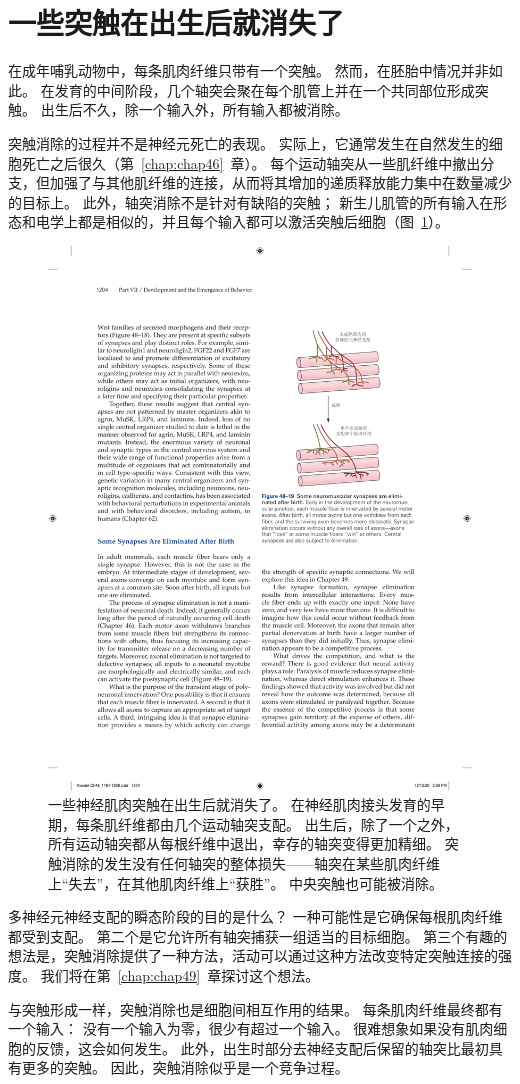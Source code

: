 \section{一些突触在出生后就消失了}

在成年哺乳动物中，每条肌肉纤维只带有一个突触。
然而，在胚胎中情况并非如此。
在发育的中间阶段，几个轴突会聚在每个肌管上并在一个共同部位形成突触。
出生后不久，除一个输入外，所有输入都被消除。


突触消除的过程并不是神经元死亡的表现。 实际上，它通常发生在自然发生的细胞死亡之后很久（第~\ref{chap:chap46}~章）。
每个运动轴突从一些肌纤维中撤出分支，但加强了与其他肌纤维的连接，从而将其增加的递质释放能力集中在数量减少的目标上。
此外，轴突消除不是针对有缺陷的突触；
新生儿肌管的所有输入在形态和电学上都是相似的，并且每个输入都可以激活突触后细胞（图~\ref{fig:48_19}）。


\begin{figure}[htbp]
	\centering
	\includegraphics[width=0.4\linewidth]{chap48/fig_48_19}
	\caption{一些神经肌肉突触在出生后就消失了。
		在神经肌肉接头发育的早期，每条肌纤维都由几个运动轴突支配。
		出生后，除了一个之外，所有运动轴突都从每根纤维中退出，幸存的轴突变得更加精细。
		突触消除的发生没有任何轴突的整体损失——轴突在某些肌肉纤维上“失去”，在其他肌肉纤维上“获胜”。
		中央突触也可能被消除。}
	\label{fig:48_19}
\end{figure}


多神经元神经支配的瞬态阶段的目的是什么？
一种可能性是它确保每根肌肉纤维都受到支配。
第二个是它允许所有轴突捕获一组适当的目标细胞。
第三个有趣的想法是，突触消除提供了一种方法，活动可以通过这种方法改变特定突触连接的强度。
我们将在第~\ref{chap:chap49}~章探讨这个想法。


与突触形成一样，突触消除也是细胞间相互作用的结果。
每条肌肉纤维最终都有一个输入：
没有一个输入为零，很少有超过一个输入。
很难想象如果没有肌肉细胞的反馈，这会如何发生。
此外，出生时部分去神经支配后保留的轴突比最初具有更多的突触。
因此，突触消除似乎是一个竞争过程。


